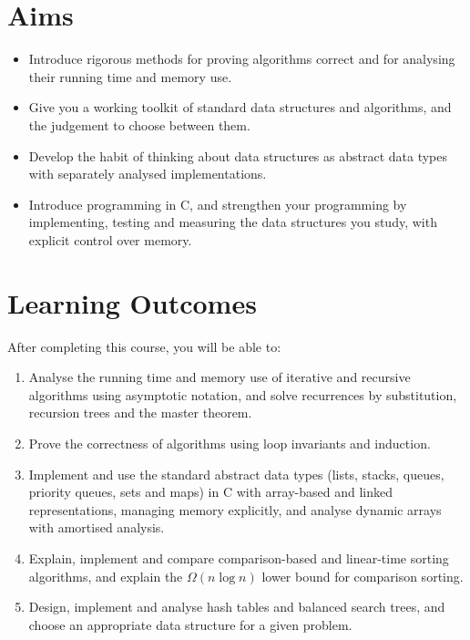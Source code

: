 \documentclass[11pt,a4paper]{article}
\begin{document}
\section{Aims}
\begin{itemize}
  \item Introduce rigorous methods for proving algorithms correct and for analysing their running time and memory use.
  \item Give you a working toolkit of standard data structures and algorithms, and the judgement to choose between them.
  \item Develop the habit of thinking about data structures as abstract data types with separately analysed implementations.
  \item Introduce programming in C, and strengthen your programming by implementing, testing and measuring the data structures you study, with explicit control over memory.
\end{itemize}

\section{Learning Outcomes}
After completing this course, you will be able to:
\begin{enumerate}[label=LO\arabic*.]
  \item Analyse the running time and memory use of iterative and recursive algorithms using asymptotic notation, and solve recurrences by substitution, recursion trees and the master theorem.
  \item Prove the correctness of algorithms using loop invariants and induction.
  \item Implement and use the standard abstract data types (lists, stacks, queues, priority queues, sets and maps) in C with array-based and linked representations, managing memory explicitly, and analyse dynamic arrays with amortised analysis.
  \item Explain, implement and compare comparison-based and linear-time sorting algorithms, and explain the $\Omega(n \log n)$ lower bound for comparison sorting.
  \item Design, implement and analyse hash tables and balanced search trees, and choose an appropriate data structure for a given problem.
\end{enumerate}
\end{document}
